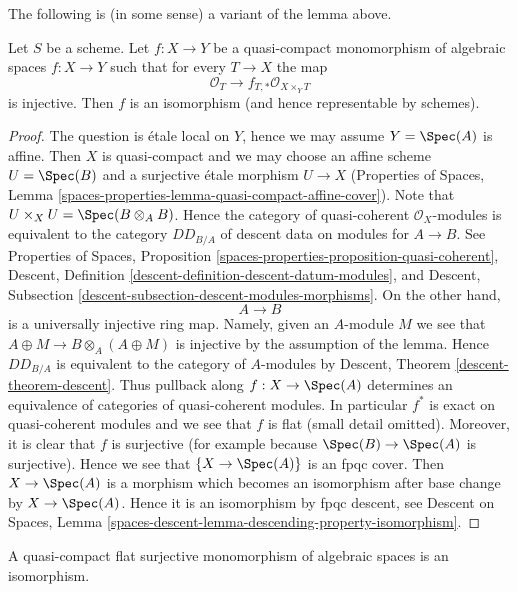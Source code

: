 \noindent
The following is (in some sense) a variant of the lemma above.

\begin{lemma}
\label{lemma-ui-case}
Let $S$ be a scheme. Let $f : X \to Y$ be a quasi-compact monomorphism
of algebraic spaces $f : X \to Y$ such that for every $T \to X$ the map
$$
\mathcal{O}_T \to f_{T,*}\mathcal{O}_{X \times_Y T}
$$
is injective. Then $f$ is an isomorphism (and hence representable by schemes).
\end{lemma}

\begin{proof}
The question is \'etale local on $Y$, hence we may assume $Y = \Spec(A)$
is affine. Then $X$ is quasi-compact and we may choose an affine scheme
$U = \Spec(B)$ and a surjective \'etale morphism $U \to X$
(Properties of Spaces, Lemma
\ref{spaces-properties-lemma-quasi-compact-affine-cover}).
Note that $U \times_X U = \Spec(B \otimes_A B)$. Hence the category of
quasi-coherent $\mathcal{O}_X$-modules is equivalent to the
category $DD_{B/A}$ of descent data on modules for $A \to B$.
See Properties of Spaces, Proposition
\ref{spaces-properties-proposition-quasi-coherent},
Descent, Definition \ref{descent-definition-descent-datum-modules}, and
Descent, Subsection \ref{descent-subsection-descent-modules-morphisms}.
On the other hand,
$$
A \to B
$$
is a universally injective ring map. Namely, given an
$A$-module $M$ we see that $A \oplus M \to B \otimes_A (A \oplus M)$
is injective by the assumption of the lemma. Hence
$DD_{B/A}$ is equivalent to the category of $A$-modules by
Descent, Theorem \ref{descent-theorem-descent}. Thus pullback along
$f : X \to \Spec(A)$ determines an equivalence of categories of
quasi-coherent modules. In particular $f^*$ is exact on
quasi-coherent modules and we see that $f$ is flat
(small detail omitted). Moreover, it is clear that $f$ is surjective
(for example because $\Spec(B) \to \Spec(A)$ is surjective).
Hence we see that $\{X \to \Spec(A)\}$ is an fpqc cover.
Then $X \to \Spec(A)$ is a morphism which becomes an isomorphism
after base change by $X \to \Spec(A)$. Hence it is an isomorphism by
fpqc descent, see Descent on Spaces, Lemma
\ref{spaces-descent-lemma-descending-property-isomorphism}.
\end{proof}

\begin{lemma}
\label{lemma-flat-surjective-monomorphism}
A quasi-compact flat surjective monomorphism of algebraic spaces
is an isomorphism.
\end{lemma}

